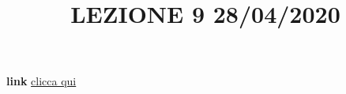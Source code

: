 \title{LEZIONE 9 28/04/2020}\newline
\textbf{link} \href{https://web.microsoftstream.com/video/673607e9-751d-488b-bb1d-79ee783a9b29}{clicca qui}